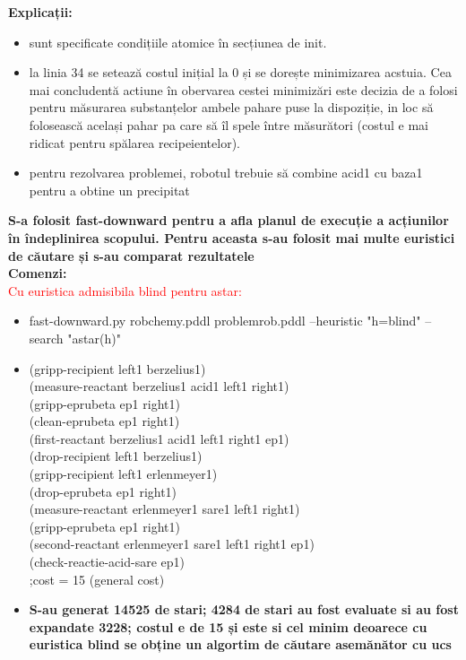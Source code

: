 \textbf{Explicații:}
\begin{itemize}
    \setlength\itemsep{0em}
    \item sunt specificate condițiile atomice în secțiunea de init.
    \item la linia 34 se setează costul inițial la 0 și se dorește minimizarea acstuia. Cea mai concludentă actiune în obervarea cestei minimizări este decizia de a folosi pentru măsurarea substanțelor ambele pahare puse la dispoziție, in loc să folosească același pahar pa care să îl spele între măsurători (costul e mai ridicat pentru spălarea recipeientelor).
    \item pentru rezolvarea problemei, robotul trebuie să combine acid1 cu baza1 pentru a obtine un precipitat

\end{itemize}

\textbf{S-a folosit fast-downward pentru a afla planul de execuție a acțiunilor în îndeplinirea scopului. Pentru aceasta s-au folosit mai multe euristici de căutare și s-au comparat rezultatele }\\

\textbf{Comenzi:} \\
  \textcolor{red}{Cu euristica admisibila blind pentru astar:}
   \begin{itemize}
    \setlength\itemsep{0em}
    \item   fast-downward.py robchemy.pddl problemrob.pddl --heuristic "h=blind" --search "astar(h)"
    \item (gripp-recipient left1 berzelius1)\\
        (measure-reactant berzelius1 acid1 left1 right1)\\
       (gripp-eprubeta ep1 right1)\\
        (clean-eprubeta ep1 right1)\\
        (first-reactant berzelius1 acid1 left1 right1 ep1)\\
        (drop-recipient left1 berzelius1)\\
        (gripp-recipient left1 erlenmeyer1)\\
        (drop-eprubeta ep1 right1)\\
        (measure-reactant erlenmeyer1 sare1 left1 right1)\\
        (gripp-eprubeta ep1 right1)\\
        (second-reactant erlenmeyer1 sare1 left1 right1 ep1)\\
        (check-reactie-acid-sare ep1)\\
        ;cost = 15 (general cost)
    \item \textbf{S-au generat 14525 de stari; 4284 de stari au fost evaluate si au fost expandate 3228; costul e de 15 și este si cel minim deoarece cu euristica blind se obține un algortim de căutare asemănător cu ucs}
\end{itemize}


